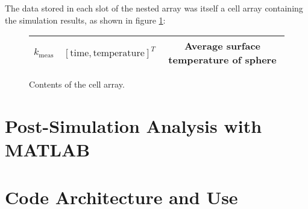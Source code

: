 The data stored in each slot of the nested array was itself a cell array
containing the simulation results, as shown in figure \ref{fig:cellarray}:

\begin{figure}
\label{fig:cellarray}

\centering
\begin{tabular}{| c | c | c |}
\hline
\(k_\textrm{meas}\) & \( \left[ \textrm{time}, \textrm{temperature} \right]^T\) & Average surface temperature of sphere\\
\hline
\end{tabular}
\caption{Contents of the cell array.}
\end{figure}

\section{Post-Simulation Analysis with MATLAB}

\section{Code Architecture and Use}

